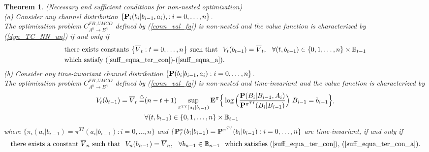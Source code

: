 \documentclass[11pt, a4paper, journal,onecolumn]{IEEEtran}
\newcommand{\mb}{\mathbb}
\newcommand{\sr}{\stackrel}
\newcommand{\rar}{\rightarrow}
\newcommand{\tri}{\sr{\triangle}{=}}
\newcommand{\hso}{\hspace{.1in}}
\newtheorem{theorem}{Theorem}[section]
\begin{document}
\begin{theorem}(Necessary and sufficient conditions for non-nested optimization)\\
\label{non-nest_the}
(a) Consider any channel distribution $\{{\bf P}_i(b_i|b_{i-1},a_i), : i =0, \ldots, n\}$.\\ The optimization problem  $C_{A^n \rar B^n}^{FB,UMCO}$ defined by  (\ref{conn_val_fu}) is non-nested and the value function is characterized by  (\ref{dyn_TC_NN_un}) if and only if 
\begin{align}
&\mbox{there exists  constants $\big\{\overline{V}_t: t=0, \ldots, n\big\}$ such that}   \hso V_t(b_{t-1})=\overline{V}_t,\hso  \forall (t,  b_{t-1}) \in  \{0,1,\ldots, n\} \times  {\mb B}_{t-1} \nonumber \\
& \mbox{which satisfy (\ref{suff_equa_ter_con})-(\ref{suff_equa_a})}. \label{ST_D}
\end{align} 
(b) Consider any time-invariant channel distribution $\{{\bf P}(b_i|b_{i-1},a_i): i=0, \ldots, n\}$. \\
The optimization problem  $C_{A^n \rar B^n}^{FB,UMCO}$ defined by  (\ref{conn_val_fu}) is non-nested and time-invariant and the value function is characterized by  
\begin{align}
V_t(b_{t-1})= \overline{V}_t \tri& (n-t+1) \sup_{\pi^{TI}(a_i|b_{i-1})}{\bf E}^\pi\Big\{\log\Big(\frac{{\bf P}(B_i|B_{i-1},A_i)}{{\bf P}^{\pi^{TI}}(B_i|B_{i-1})}\Big)\Big|B_{i-1}=b_{i-1}\Big\}, \nonumber \\ & \forall (t, b_{t-1})\in \{0, 1, \ldots, n\} \times {\mb B}_{t-1} \label{dyn_TC_NN_un_st_TI}
\end{align}
where $\{\pi_i(a_i|b_{i-1})= \pi^{TI}(a_i|b_{i-1}): i=0, \ldots, n\}$ and $\{{\bf  P}_i^{\pi}(b_i|b_{i-1})= {\bf P}^{\pi^{TI}}(b_i|b_{i-1}): i=0, \ldots, n\}$ are time-invariant,   if and only if 
 \begin{align}
\mbox{there exists a constant $\overline{V}_n$ such that}   \hso V_n(b_{n-1})=\overline{V}_n,\hso  \forall b_{n-1} \in  {\mb B}_{n-1}  \hso \mbox{which satisfies (\ref{suff_equa_ter_con}), (\ref{suff_equa_ter_con_a})}. \label{ST_D_TI}
\end{align} 
 \end{theorem}
\end{document}
